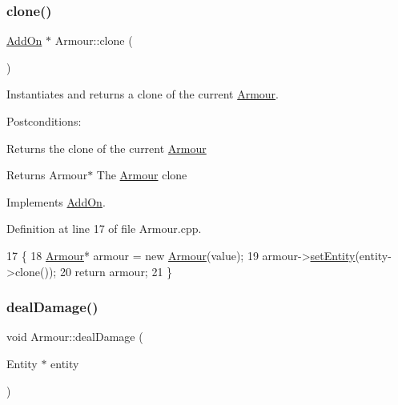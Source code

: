 \subsubsection{\texorpdfstring{clone()}{clone()}}
{\footnotesize\ttfamily \hyperlink{classAddOn}{Add\+On} $\ast$ Armour\+::clone (\begin{DoxyParamCaption}{ }\end{DoxyParamCaption})\hspace{0.3cm}{\ttfamily [virtual]}}



Instantiates and returns a clone of the current \hyperlink{classArmour}{Armour}. 

Postconditions\+:
\begin{DoxyItemize}
\item Returns the clone of the current \hyperlink{classArmour}{Armour}
\end{DoxyItemize}

\begin{DoxyReturn}{Returns}
Armour$\ast$ The \hyperlink{classArmour}{Armour} clone 
\end{DoxyReturn}


Implements \hyperlink{classAddOn_a5a090bf8b4e7260aa35d6f5b9d151955}{Add\+On}.



Definition at line 17 of file Armour.\+cpp.


\begin{DoxyCode}
17                      \{
18     \hyperlink{classArmour}{Armour}* armour = \textcolor{keyword}{new} \hyperlink{classArmour_a5fe1e213870c5eab65baa54bb4a3ef02}{Armour}(value);
19     armour->\hyperlink{classAddOn_ac9f4263e3558015fdad46adefceed197}{setEntity}(entity->clone());
20     \textcolor{keywordflow}{return} armour;
21 \}
\end{DoxyCode}
\mbox{\label{classArmour_acce6c768aaebaa559ac063e9d67c53b5}} 
\subsubsection{\texorpdfstring{deal\+Damage()}{dealDamage()}}
{\footnotesize\ttfamily void Armour\+::deal\+Damage (\begin{DoxyParamCaption}\item[{Entity $\ast$}]{entity }\end{DoxyParamCaption})\hspace{0.3cm}{\ttfamily [virtual]}}



